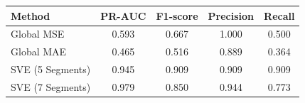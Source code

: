 \begin{tabular}{lcccc}
\toprule
Method & PR-AUC & F1-score & Precision & Recall \\
\midrule
Global MSE & 0.593 & 0.667 & 1.000 & 0.500 \\
Global MAE & 0.465 & 0.516 & 0.889 & 0.364 \\
SVE (5 Segments) & 0.945 & 0.909 & 0.909 & 0.909 \\
SVE (7 Segments) & 0.979 & 0.850 & 0.944 & 0.773 \\
\bottomrule
\end{tabular}

